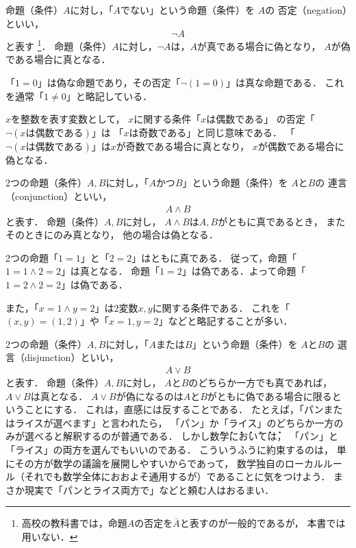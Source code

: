  命題（条件）$A$に対し，「$A$でない」という命題（条件）を
  $A$の
  否定（negation）といい，
  \begin{equation}
   \lnot A
    \label{eq:negation}
  \end{equation}
    と表す
  \footnote{高校の教科書では，命題$A$の否定を$\overline{A}$と表すのが一般的であるが，
  本書では用いない．}．
  命題（条件）$A$に対し，$\lnot A$は，$A$が真である場合に偽となり，
  $A$が偽である場合に真となる．
  
  \begin{ex}
    「$1=0$」は偽な命題であり，その否定「$\lnot (1=0)$」は真な命題である．
    これを通常「$1 \neq 0$」と略記している．

    $x$を整数を表す変数として，
    $x$に関する条件「$x$は偶数である」
    の否定「$\lnot ( x \text{は偶数である})$」は
    「$x$は奇数である」と同じ意味である．
    「$\lnot ( x \text{は偶数である})$」は$x$が奇数である場合に真となり，
    $x$が偶数である場合に偽となる．
  \end{ex}

  2つの命題（条件）$A,  B$に対し，「$A$かつ$B$」という命題（条件）を
  $A$と$B$の
  連言（conjunction）といい，
  \begin{align}
   A \land B 
    \label{eq:conjunction}
  \end{align}
  と表す．
  命題（条件）$A,  B$に対し，
  $A \land B$は$A,  B$がともに真であるとき，
  またそのときにのみ真となり，
  他の場合は偽となる．

  \begin{ex}
    2つの命題「$1=1$」と「$2=2$」はともに真である．
    従って，命題「$1=1 \land 2=2$」は真となる．
     命題「$1=2$」は偽である．よって命題「$1=2 \land 2=2$」は偽である．

     また，「$x=1 \land y=2$」は2変数$x,  y$に関する条件である．
     これを「$(x,y)=(1,2)$」や「$ x = 1,  y=2$」などと略記することが多い．
  \end{ex}

  2つの命題（条件）$A,  B$に対し，「$A$または$B$」という命題（条件）を
  $A$と$B$の
  選言（disjunction）といい，
  \begin{align}
    A \lor B
    \label{eq:disjunction}
  \end{align}
  と表す．
  命題（条件）$A,  B$に対し，
  $A$と$B$のどちらか一方でも真であれば，$A \lor B$は真となる．
  $A \lor B$が偽になるのは$A$と$B$がともに偽である場合に限るということにする．
  これは，直感には反することである．
  たとえば，「パンまたはライスが選べます」と言われたら，
  「パン」か「ライス」のどちらか一方のみが選べると解釈するのが普通である．
  しかし\.数\.学\.に\.お\.い\.て\.は，
  「パン」と「ライス」の両方を選んでもいいのである．
  こういうふうに約束するのは，
  単にその方が数学の議論を展開しやすいからであって，
  数学独自のローカルルール（それでも数学全体におおよそ通用するが）であることに気をつけよう．
  まさか現実で「パンとライス両方で」などと頼む人はおるまい．


